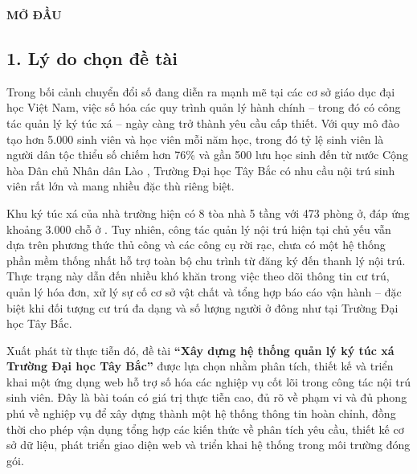 \documentclass[13pt,a4paper]{extarticle}
\numberwithin{figure}{section}
\numberwithin{table}{section}
\begin{document}
	
	\newpage
	\begin{center}
		\fontsize{14pt}{17pt}\selectfont
		\textbf{MỞ ĐẦU}
	\end{center}
	
	\subsection*{1. Lý do chọn đề tài}
	
	Trong bối cảnh chuyển đổi số đang diễn ra mạnh mẽ tại các cơ sở giáo dục đại học Việt Nam, việc số hóa các quy trình quản lý hành chính -- trong đó có công tác quản lý ký túc xá -- ngày càng trở thành yêu cầu cấp thiết. Với quy mô đào tạo hơn 5.000 sinh viên và học viên mỗi năm học, trong đó tỷ lệ sinh viên là người dân tộc thiểu số chiếm hơn 76\% và gần 500 lưu học sinh đến từ nước Cộng hòa Dân chủ Nhân dân Lào \cite{utb_khaigiang2024}, Trường Đại học Tây Bắc có nhu cầu nội trú sinh viên rất lớn và mang nhiều đặc thù riêng biệt.
	
	Khu ký túc xá của nhà trường hiện có 8 tòa nhà 5 tầng với 473 phòng ở, đáp ứng khoảng 3.000 chỗ ở \cite{utb_ktx}. Tuy nhiên, công tác quản lý nội trú hiện tại chủ yếu vẫn dựa trên phương thức thủ công và các công cụ rời rạc, chưa có một hệ thống phần mềm thống nhất hỗ trợ toàn bộ chu trình từ đăng ký đến thanh lý nội trú. Thực trạng này dẫn đến nhiều khó khăn trong việc theo dõi thông tin cư trú, quản lý hóa đơn, xử lý sự cố cơ sở vật chất và tổng hợp báo cáo vận hành -- đặc biệt khi đối tượng cư trú đa dạng và số lượng người ở đông như tại Trường Đại học Tây Bắc.
	
	Xuất phát từ thực tiễn đó, đề tài \textbf{``Xây dựng hệ thống quản lý ký túc xá Trường Đại học Tây Bắc''} được lựa chọn nhằm phân tích, thiết kế và triển khai một ứng dụng web hỗ trợ số hóa các nghiệp vụ cốt lõi trong công tác nội trú sinh viên. Đây là bài toán có giá trị thực tiễn cao, đủ rõ về phạm vi và đủ phong phú về nghiệp vụ để xây dựng thành một hệ thống thông tin hoàn chỉnh, đồng thời cho phép vận dụng tổng hợp các kiến thức về phân tích yêu cầu, thiết kế cơ sở dữ liệu, phát triển giao diện web và triển khai hệ thống trong môi trường đóng gói.
	
\end{document}
